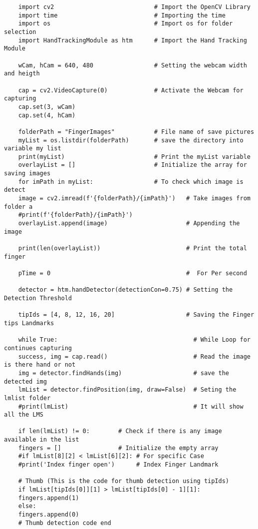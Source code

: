 \begin{verbatim}
	import cv2                            # Import the OpenCV Library
	import time                           # Importing the time
	import os                             # Import os for folder selection
	import HandTrackingModule as htm      # Import the Hand Tracking Module
	
	wCam, hCam = 640, 480                 # Setting the webcam width and heigth
	
	cap = cv2.VideoCapture(0)             # Activate the Webcam for capturing
	cap.set(3, wCam)
	cap.set(4, hCam)
	
	folderPath = "FingerImages"           # File name of save pictures
	myList = os.listdir(folderPath)       # save the directory into variable my list
	print(myList)                         # Print the myList variable
	overlayList = []                      # Initialize the array for saving images
	for imPath in myList:                 # To check which image is detect
	image = cv2.imread(f'{folderPath}/{imPath}')   # Take images from folder a
	#print(f'{folderPath}/{imPath}')
	overlayList.append(image)                      # Appending the image 
	
	print(len(overlayList))                        # Print the total finger 
	
	pTime = 0                                      #  For Per second
	
	detector = htm.handDetector(detectionCon=0.75) # Setting the Detection Threshold
	
	tipIds = [4, 8, 12, 16, 20]                    # Saving the Finger tips Landmarks 
	
	while True:                                      # While Loop for continues capturing
	success, img = cap.read()                        # Read the image is there hand or not
	img = detector.findHands(img)                    # save the detected img
	lmList = detector.findPosition(img, draw=False)  # Seting the lmlist folder
	#print(lmList)                                   # It will show all the LMS
	
	if len(lmList) != 0:        # Check if there is any image available in the list
	fingers = []                # Initialize the empty array
	#if lmList[8][2] < lmList[6][2]: # For specific Case
	#print('Index finger open')      # Index Finger Landmark
	
	# Thumb (This is the code for thumb detection using tipIds)
	if lmList[tipIds[0]][1] > lmList[tipIds[0] - 1][1]:
	fingers.append(1)
	else:
	fingers.append(0)
	# Thumb detection code end
	

\end{verbatim}
